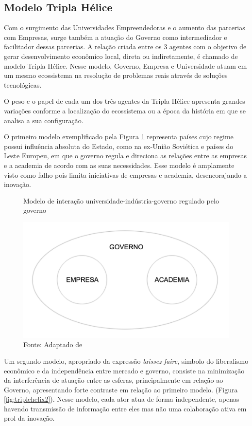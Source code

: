 \subsection{Modelo Tripla Hélice}
\label{cha:univ_empreend}

Com o surgimento das Universidades Empreendedoras e o aumento das parcerias com Empresas, surge também a atuação do Governo como intermediador e facilitador dessas parcerias. A relação criada entre os 3 agentes com o objetivo de gerar desenvolvimento econômico local, direta ou indiretamente, é chamado de modelo Tripla Hélice. Nesse modelo, Governo, Empresa e Universidade atuam em um mesmo ecossistema na resolução de problemas reais através de soluções tecnológicas.

O peso e o papel de cada um dos três agentes da Tripla Hélice apresenta grandes variações conforme a localização do ecossistema ou a época da história em que se analisa a sua configuração. \cite{etzkowitz2000}

O primeiro modelo exemplificado pela Figura \ref{fig:triplehelix1} representa países  cujo regime possui influência absoluta do Estado, como na ex-União Soviética e países do Leste Europeu, em que o governo regula e direciona as relações entre as empresas e a academia de acordo com as suas necessidades. Esse modelo é amplamente visto como falho pois limita iniciativas de empresas e academia, desencorajando a inovação.

\begin{figure}[H]
\caption{Modelo de interação universidade-indústria-governo regulado pelo governo}
\centerline{\includegraphics[scale=0.5]{img/triplehelix1}}
\label{fig:triplehelix1}
\caption* {Fonte: Adaptado de }
\end{figure}

Um segundo modelo, apropriado da expressão \textit{laissez-faire}, símbolo do liberalismo econômico e da independência entre mercado e governo, consiste na minimização da interferência de atuação entre as esferas, principalmente em relação ao Governo, apresentando forte contraste em relação ao primeiro modelo. (Figura \ref{fig:triplehelix2}). Nesse modelo, cada ator atua de forma independente, apenas havendo transmissão de informação entre eles mas não uma colaboração ativa em prol da inovação.

